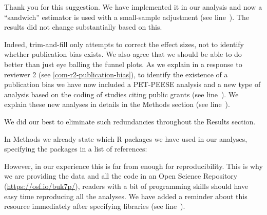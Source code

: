 Thank you for this suggestion. We have implemented it in our analysis and now a ``sandwich'' estimator is used with a small-sample adjustment \citep{hedges2010} (see line~). The results did not change substantially based on this.



Indeed, trim-and-fill only attempts to correct the effect sizes, not to identify whether publication bias exists. We also agree that we should be able to do better than just eye balling the funnel plots. As we explain in a response to reviewer 2 (see \ref{com-r2-publication-bias}), to identify the existence of a publication bias we have now included a PET-PEESE analysis and a new type of analysis based on the coding of studies citing public grants (see line~). We explain these new analyses in details in the Methods section (see line~). 



We did our best to eliminate such redundancies throughout the Results section.



In Methods we already state which R packages we have used in our analyses, specifying the packages in a list of references:


However, in our experience this is far from enough for reproducibility. This is why we are providing the data and all the code in an Open Science Repository (\url{https://osf.io/buk7p/}), readers with a bit of programming skills should have easy time reproducing all the analyses. We have added a reminder about this resource immediately after specifying libraries (see line~). 


